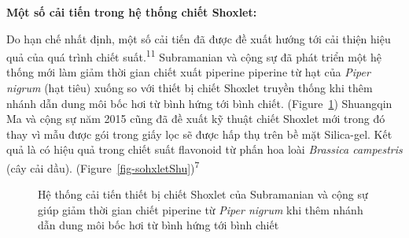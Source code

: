 \documentclass[
  twocolumn,
  landscape]{report}
\begin{document}
\textbf{Một số cải tiến trong hệ thống chiết Shoxlet:}

Do hạn chế nhất định, một số cải tiến đã được đề xuất hướng tới cải
thiện hiệu quả của quá trình chiết suất.\textsuperscript{11} Subramanian
và cộng sự đã phát triển một hệ thống mới làm giảm thời gian chiết xuất
piperine piperine từ hạt của \emph{Piper nigrum} (hạt tiêu) xuống so với
thiết bị chiết Shoxlet truyền thống khi thêm nhánh dẫn dung môi bốc hơi
từ bình hứng tới bình chiết. (Figure~\ref{fig-sohxletSub}) Shuangqin Ma
và cộng sự năm 2015 cũng đã đề xuất kỹ thuật chiết Shoxlet mới trong đó
thay vì mẫu được gói trong giấy lọc sẽ được hấp thụ trên bề mặt
Silica-gel. Kết quả là có hiệu quả trong chiết suất flavonoid từ phấn
hoa loài \emph{Brassica campestris} (cây cải dầu).
(Figure~\ref{fig-sohxletShu})\textsuperscript{7}

\begin{figure}


\caption{\label{fig-sohxletSub}Hệ thống cải tiến thiết bị chiết Shoxlet
của Subramanian và cộng sự giúp giảm thời gian chiết piperine từ
\emph{Piper nigrum} khi thêm nhánh dẫn dung môi bốc hơi từ bình hứng tới
bình chiết}

\end{figure}%
\end{document}
